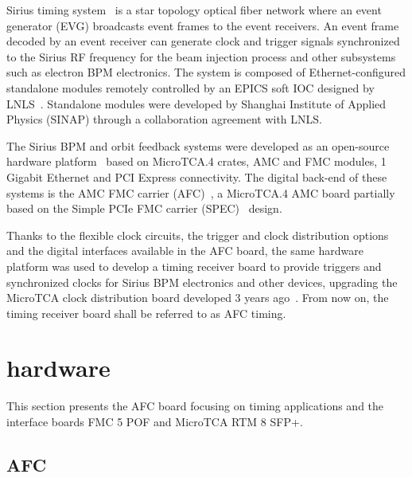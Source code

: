 \documentclass[a4paper,
               biblatex,      %
               ]{jacow}
\begin{document}
Sirius timing system~\cite{timing_icalepcs15} is a star topology optical fiber network where an event generator (EVG) broadcasts event frames to the event receivers. An event frame decoded by an event receiver can generate clock and trigger signals synchronized to the Sirius RF frequency for the beam injection process and other subsystems such as electron BPM electronics. The system is composed of Ethernet-configured standalone modules remotely controlled by an EPICS soft IOC designed by LNLS~\cite{sinap-timing-epics-ioc}. Standalone modules were developed by Shanghai Institute of Applied Physics (SINAP) through a collaboration agreement with LNLS. 


The Sirius BPM and orbit feedback systems were developed as an open-source hardware platform~\cite{ebpm_icalepcs13} based on MicroTCA.4 crates, AMC and FMC modules, 1 Gigabit Ethernet and PCI Express connectivity. The digital back-end of these systems is the AMC FMC carrier (AFC)~\cite{afc-git}, a MicroTCA.4 AMC board partially based on the Simple PCIe FMC carrier (SPEC)~\cite{spec} design. 

Thanks to the flexible clock circuits, the trigger and clock distribution options and the digital interfaces available in the AFC board, the same hardware platform was used to develop a timing receiver board to provide triggers and synchronized clocks for Sirius BPM electronics and other devices, upgrading the MicroTCA clock distribution board developed 3 years ago~\cite{timing_icalepcs15}. From now on, the timing receiver board shall be referred to as AFC timing. 

\section{hardware}
This section presents the AFC board focusing on timing applications and the interface boards FMC 5 POF and MicroTCA RTM 8 SFP+.

\subsection{AFC}
\end{document}
